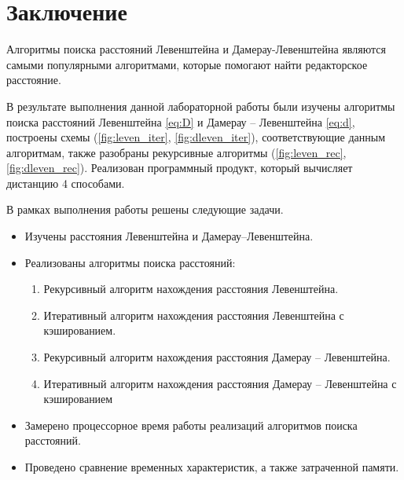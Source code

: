 \chapter*{Заключение}

    Алгоритмы поиска расстояний Левенштейна и Дамерау-Левенштейна являются самыми популярными алгоритмами, которые помогают найти редакторское расстояние.
    
    В результате выполнения данной лабораторной работы были изучены алгоритмы поиска расстояний Левенштейна \eqref{eq:D} и Дамерау – Левенштейна \eqref{eq:d}, построены схемы (\ref{fig:leven_iter}, \ref{fig:dleven_iter}), соответствующие данным алгоритмам, также разобраны рекурсивные алгоритмы (\ref{fig:leven_rec}, \ref{fig:dleven_rec}). Реализован программный продукт, который вычисляет дистанцию 4 способами.
    
    В рамках выполнения работы решены следующие задачи.

    \begin{itemize}
        \item Изучены расстояния Левенштейна и Дамерау–Левенштейна.
        \item Реализованы алгоритмы поиска расстояний:
        \begin{enumerate}
            \item Рекурсивный алгоритм нахождения расстояния Левенштейна.
            \item Итеративный алгоритм нахождения расстояния Левенштейна с кэшированием.
            \item Рекурсивный алгоритм нахождения расстояния Дамерау – Левенштейна.
            \item Итеративный алгоритм нахождения расстояния Дамерау – Левенштейна с кэшированием
        \end{enumerate}
        \item Замерено процессорное время работы реализаций алгоритмов поиска расстояний.
        \item Проведено сравнение временных характеристик, а также затраченной памяти.
    \end{itemize}

